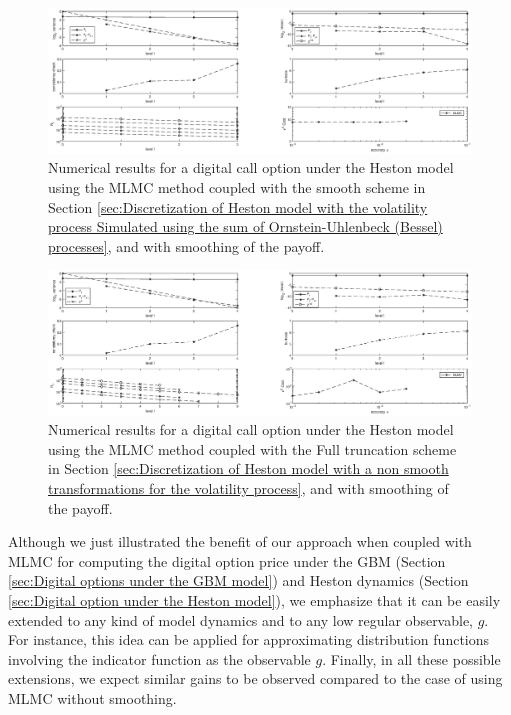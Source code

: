 \FloatBarrier
	\begin{figure}[h!]
\centering
\includegraphics[width=1.2\linewidth]{./figures/MLMC_binary_Heston_opt/with_smoothing/OU/digital_option_set1_L_0_4_steps_L_6}

\caption{Numerical results for a digital call option under the Heston model using the MLMC method coupled with  the smooth   scheme in Section \ref{sec:Discretization of Heston model with the volatility process Simulated using the sum of  Ornstein-Uhlenbeck (Bessel) processes}, and with smoothing of the payoff.}
\label{fig:euler_digital_Heston_with_smoothing_OU}
\end{figure}
\FloatBarrier
	\begin{figure}[h!]
\centering
\includegraphics[width=1.2\linewidth]{./figures/MLMC_binary_Heston_opt/with_smoothing/FT/digital_option_set1_L_0_4_steps_L_6}

\caption{Numerical results for a digital call option under the Heston model using the MLMC method coupled with   the Full truncation scheme in Section \ref{sec:Discretization of Heston model with a non smooth transformations for the volatility process}, and with smoothing of the payoff.}
\label{fig:euler_digital_Heston_with_smoothing_FT}
\end{figure}
\FloatBarrier


\begin{remark}
Although we just illustrated the benefit of our approach when coupled with MLMC for computing the digital option price under the GBM (Section \ref{sec:Digital options under the GBM model}) and Heston dynamics (Section \ref{sec:Digital option under the Heston model}), we emphasize that it can be easily extended to any kind of model dynamics and  to any low regular observable, $g$. For instance, this idea can be applied for approximating distribution functions involving the indicator function as the observable $g$. Finally, in all these possible extensions, we expect similar gains to be observed compared to the case of using MLMC without smoothing.
\end{remark}

